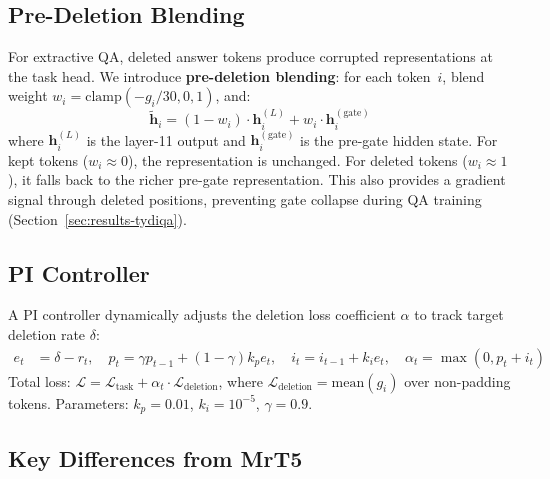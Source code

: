 \documentclass[11pt,a4paper]{article}
\begin{document}
\subsection{Pre-Deletion Blending}
\label{sec:pre-deletion-blending}

For extractive QA, deleted answer tokens produce corrupted representations at the task head. We introduce \textbf{pre-deletion blending}: for each token~$i$, blend weight $w_i = \text{clamp}(-g_i/30,0,1)$, and:
\begin{equation}
    \tilde{\mathbf{h}}_i = (1-w_i)\cdot\mathbf{h}_i^{(L)} + w_i\cdot\mathbf{h}_i^{(\text{gate})}
    \label{eq:blending}
\end{equation}
where $\mathbf{h}_i^{(L)}$ is the layer-11 output and $\mathbf{h}_i^{(\text{gate})}$ is the pre-gate hidden state. For kept tokens ($w_i\approx0$), the representation is unchanged. For deleted tokens ($w_i\approx1$), it falls back to the richer pre-gate representation. This also provides a gradient signal through deleted positions, preventing gate collapse during QA training (Section~\ref{sec:results-tydiqa}).


\subsection{PI Controller}
\label{sec:pi-controller}

A PI controller dynamically adjusts the deletion loss coefficient $\alpha$ to track target deletion rate $\delta$:
\begin{align}
    e_t &= \delta - r_t, \quad
    p_t = \gamma p_{t-1} + (1-\gamma)k_p e_t, \quad
    i_t = i_{t-1} + k_i e_t, \quad
    \alpha_t = \max(0, p_t+i_t)
\end{align}
Total loss: $\mathcal{L} = \mathcal{L}_{\text{task}} + \alpha_t\cdot\mathcal{L}_{\text{deletion}}$, where $\mathcal{L}_{\text{deletion}} = \text{mean}(g_i)$ over non-padding tokens. Parameters: $k_p=0.01$, $k_i=10^{-5}$, $\gamma=0.9$.


\subsection{Key Differences from MrT5}
\end{document}
